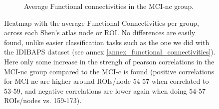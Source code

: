\documentclass[a4paper,12pt]{elsarticle}  %
\begin{document}
\begin{figure}[h]
\begin{subfigure}[b]{0.72\textwidth}
				\caption{Average Functional connectivities in the MCI-nc group.}
				\label{fig_FC_MCI-nc_74sub}
			\end{subfigure}
			\caption{Heatmap with the average Functional Connectivities per group, across each Shen's atlas node or ROI. No differences are easily found, unlike easier classification tasks such as the one we did with the IDIBAPS dataset (see annex \ref{annex_functional_connectivities}). Here only some increase in the strengh of pearson correlations in the MCI-nc group compared to the MCI-c is found (positive correlations for MCI-nc are higher around ROIs/node 54-57 when correlated to 53-59, and negative correlations are lower again when doing 54-57 ROIs/nodes vs. 159-173).}
			\label{fig_FC_74sub} 
		\end{figure}
		\clearpage	
		

		
	
		
		
		
\end{document}
